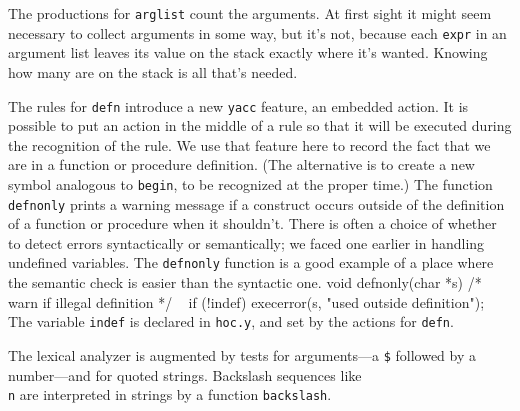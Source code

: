 \noindent
The productions for {\tt arglist} count the arguments. At first
sight it might seem necessary to collect arguments in some way,
but it's not, because each {\tt expr} in an argument list leaves
its value on the stack exactly where it's wanted. Knowing how
many are on the stack is all that's needed.

The rules for {\tt defn} introduce a new {\tt yacc} feature,
an embedded action. It is possible to put an action in the middle
of a rule so that it will be executed during the recognition
of the rule. We use that feature here to record the fact that
we are in a function or procedure definition. (The alternative
is to create a new symbol analogous to {\tt begin}, to be
recognized at the proper time.) The function {\tt defnonly}
prints a warning message if a construct occurs outside of the
definition of a function or procedure when it shouldn't.
There is often a choice of whether to detect errors syntactically
or semantically; we faced one earlier in handling undefined
variables. The {\tt defnonly} function is a good example of a
place where the semantic check is easier than the syntactic one.
\begincode
void defnonly(char *s)  /* warn if illegal definition */
{
~       if (!indef) execerror(s, "used outside definition");
}
\endcode
\noindent
The variable {\tt indef} is declared in {\tt hoc.y}, and set
by the actions for {\tt defn}.

The lexical analyzer is augmented by tests for arguments---a
{\tt\$} followed by a number---and for quoted strings. Backslash
sequences like {\tt\\n} are interpreted in strings by a function
{\tt backslash}.

